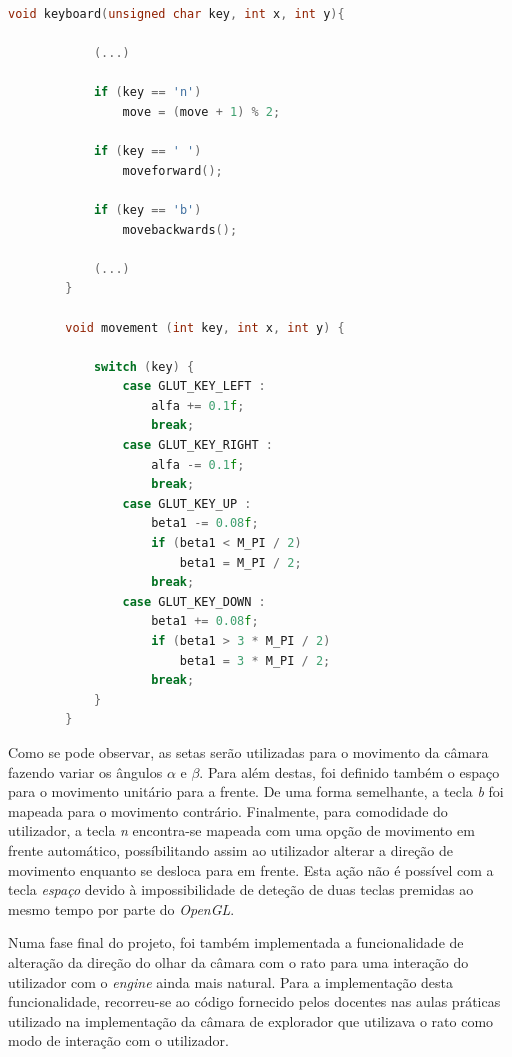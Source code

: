 \documentclass[a4paper]{article}
\begin{document}
\begin{lstlisting}[language=C++, caption=Definição das funções responsáveis pelo movimento para frente e trás da câmara.]
        void keyboard(unsigned char key, int x, int y){

            (...)

            if (key == 'n')
                move = (move + 1) % 2;

            if (key == ' ')
                moveforward();

            if (key == 'b')
                movebackwards();

            (...)
        }

        void movement (int key, int x, int y) {

            switch (key) {
                case GLUT_KEY_LEFT :
                    alfa += 0.1f;
                    break;
                case GLUT_KEY_RIGHT :
                    alfa -= 0.1f;
                    break;
                case GLUT_KEY_UP :
                    beta1 -= 0.08f;
                    if (beta1 < M_PI / 2)
                        beta1 = M_PI / 2;
                    break;
                case GLUT_KEY_DOWN :
                    beta1 += 0.08f;
                    if (beta1 > 3 * M_PI / 2)
                        beta1 = 3 * M_PI / 2;
                    break;
            }
        }
\end{lstlisting}

Como se pode observar, as setas serão utilizadas para o movimento da câmara fazendo variar os ângulos $\alpha$ e $\beta$. Para além destas, foi definido também o espaço para o movimento unitário para a frente. De uma forma semelhante, a tecla \textit{b} foi mapeada para o movimento contrário. Finalmente, para comodidade do utilizador, a tecla \textit{n} encontra-se mapeada com uma opção de movimento em frente automático, possíbilitando assim ao utilizador alterar a direção de movimento enquanto se desloca para em frente. Esta ação não é possível com a tecla \textit{espaço} devido à impossibilidade de deteção de duas teclas premidas ao mesmo tempo por parte do \textit{OpenGL}.

Numa fase final do projeto, foi também implementada a funcionalidade de alteração da direção do olhar da câmara com o rato para uma interação do utilizador com o \textit{engine} ainda mais natural. Para a implementação desta funcionalidade, recorreu-se ao código fornecido pelos docentes nas aulas práticas utilizado na implementação da câmara de explorador que utilizava o rato como modo de interação com o utilizador.
\end{document}
